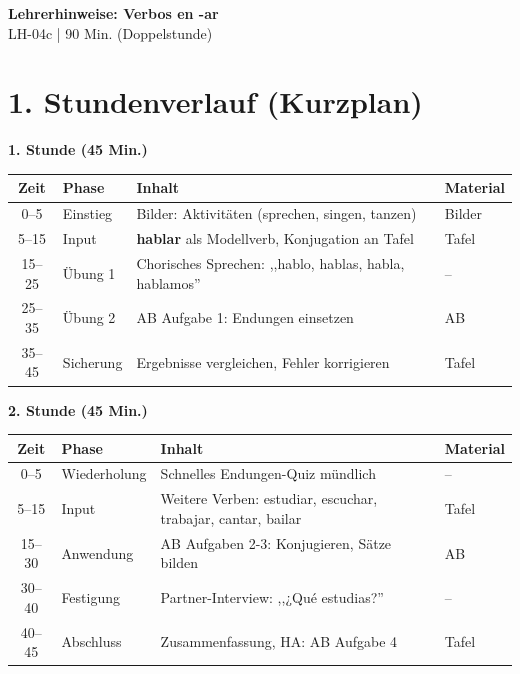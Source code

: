 \documentclass[11pt, a4paper]{article}
\newcommand{\fachfarbe}{spanisch}
\newcommand{\thema}{Verbos en -ar}
\newcommand{\sequenz}{04}
\newcommand{\block}{c}
\newcommand{\dauer}{90 Min. (Doppelstunde)}
\newcommand{\es}[1]{\textcolor{\fachfarbe}{\textbf{#1}}}
\begin{document}
\begin{center}
    {\Large\bfseries\textcolor{\fachfarbe}{Lehrerhinweise: \thema}}\\[0.3em]
    {\normalsize LH-\sequenz\block{} | \dauer}
\end{center}

\vspace{10pt}


\section*{1. Stundenverlauf (Kurzplan)}

\textbf{1. Stunde (45 Min.)}

\begin{tabularx}{\textwidth}{|c|l|X|l|}
\hline
\textbf{Zeit} & \textbf{Phase} & \textbf{Inhalt} & \textbf{Material} \\
\hline
0--5 & Einstieg & Bilder: Aktivitäten (sprechen, singen, tanzen) & Bilder \\
\hline
5--15 & Input & \es{hablar} als Modellverb, Konjugation an Tafel & Tafel \\
\hline
15--25 & Übung 1 & Chorisches Sprechen: ,,hablo, hablas, habla, hablamos'' & -- \\
\hline
25--35 & Übung 2 & AB Aufgabe 1: Endungen einsetzen & AB \\
\hline
35--45 & Sicherung & Ergebnisse vergleichen, Fehler korrigieren & Tafel \\
\hline
\end{tabularx}

\vspace{1em}

\textbf{2. Stunde (45 Min.)}

\begin{tabularx}{\textwidth}{|c|l|X|l|}
\hline
\textbf{Zeit} & \textbf{Phase} & \textbf{Inhalt} & \textbf{Material} \\
\hline
0--5 & Wiederholung & Schnelles Endungen-Quiz mündlich & -- \\
\hline
5--15 & Input & Weitere Verben: estudiar, escuchar, trabajar, cantar, bailar & Tafel \\
\hline
15--30 & Anwendung & AB Aufgaben 2-3: Konjugieren, Sätze bilden & AB \\
\hline
30--40 & Festigung & Partner-Interview: ,,¿Qué estudias?'' & -- \\
\hline
40--45 & Abschluss & Zusammenfassung, HA: AB Aufgabe 4 & Tafel \\
\hline
\end{tabularx}
\end{document}
